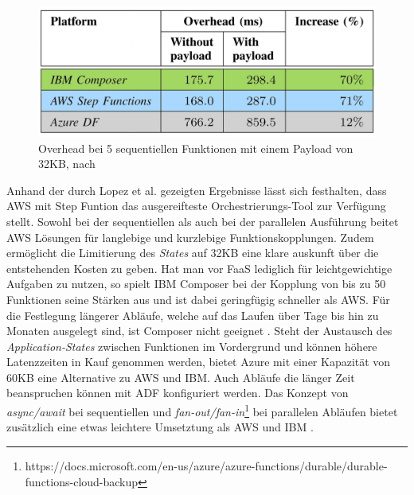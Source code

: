 \documentclass[11pt]{article}
\begin{document}
\begin{figure}[H]
\caption{Overhead bei 5 sequentiellen Funktionen mit einem Payload von 32KB, nach \cite{lopez2018comparison}}
\label{fig:orchestration}
\centering
\includegraphics[width=1\textwidth]{Orchestration}
\end{figure} 
Anhand der durch Lopez et al. gezeigten Ergebnisse lässt sich festhalten, dass AWS mit Step Funtion das ausgereifteste Orchestrierungs-Tool zur Verfügung stellt. Sowohl bei der sequentiellen als auch bei der parallelen Ausführung beitet AWS Lösungen für langlebige und kurzlebige Funktionskopplungen. Zudem ermöglicht die Limitierung des \textit{States} auf 32KB eine klare auskunft über die entstehenden Kosten zu geben. Hat man vor FaaS lediglich für leichtgewichtige Aufgaben zu nutzen, so spielt IBM Composer bei der Kopplung von bis zu 50 Funktionen seine Stärken aus und ist dabei geringfügig schneller als AWS. Für die Festlegung längerer Abläufe, welche auf das Laufen über Tage bis hin zu Monaten ausgelegt sind, ist Composer nicht geeignet \cite{lopez2018comparison}. Steht der Austausch des \textit{Application-States} zwischen Funktionen im Vordergrund und können höhere Latenzzeiten in Kauf genommen werden, bietet Azure mit einer Kapazität von 60KB eine Alternative zu AWS und IBM. Auch Abläufe die länger Zeit beanspruchen können mit ADF konfiguriert werden. Das Konzept von \textit{async/await} bei sequentiellen und \textit{fan-out/fan-in}\footnote{https://docs.microsoft.com/en-us/azure/azure-functions/durable/durable-functions-cloud-backup} bei parallelen Abläufen bietet zusätzlich eine etwas leichtere Umsetztung als AWS und IBM \cite{lopez2018comparison}.
\end{document}
